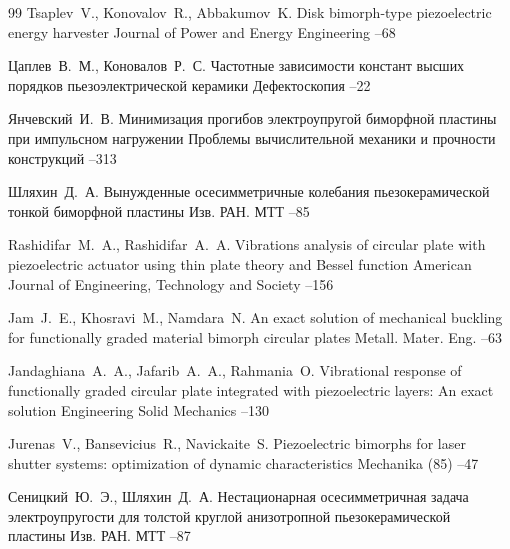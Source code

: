 \begin{thebibliography}{99}
\by Tsaplev~V., Konovalov~R., Abbakumov~K.
\paper Disk bimorph-type piezoelectric  energy harvester
\jour  Journal of Power and Energy Engineering
--68

\by Цаплев~В.~М., Коновалов~Р.~С.
\paper Частотные зависимости констант высших порядков пьезоэлектрической керамики
\jour Дефектоскопия
–22
   

\by Янчевский~И.~В.
\paper Минимизация прогибов электроупругой биморфной пластины при импульсном нагружении
\jour Проблемы вычислительной механики и прочности конструкций
--313

\by Шляхин~Д.~А.
\paper Вынужденные осесимметричные колебания пьезокерамической тонкой биморфной пластины
\jour Изв. РАН. МТТ
--85 

\by Rashidifar~M.~A., Rashidifar~A.~A.
\paper Vibrations analysis of circular plate with piezoelectric actuator using thin plate theory and Bessel function
\jour American Journal of Engineering, Technology and Society
--156



\by Jam~J.~E., Khosravi~M., Namdara~N.
\paper  An exact solution of mechanical buckling for functionally graded material bimorph circular 
plates
\jour Metall. Mater. Eng.
--63

\by Jandaghiana~A.~A., Jafarib~A.~A., Rahmania~O.
\paper Vibrational response of functionally graded circular plate integrated with piezoelectric layers: An 
exact solution
\jour Engineering Solid Mechanics
--130

\by  Jurenas~V., Bansevicius~R., Navickaite~S.
\paper Piezoelectric bimorphs for laser shutter systems: optimization of dynamic characteristics
\jour Mechanika
(85)
--47 


\by Сеницкий~Ю.~Э., Шляхин~Д.~А.
\paper Нестационарная осесимметричная задача  электроупругости для толстой круглой анизотропной пьезокерамической пластины 
\jour Изв. РАН. МТТ
--87


\end{thebibliography}
